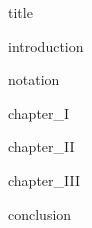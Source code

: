 \documentclass[12pt, class = report, crop = false, a4paper, twoside]{standalone}
\begin{document}
{title}

\tableofcontents
\newpage

{introduction}
\newpage

{notation}
\newpage

{chapter_I}
\newpage

{chapter_II}
\newpage

{chapter_III}
\newpage


{conclusion}
\newpage

\printbibliography
\end{document}
